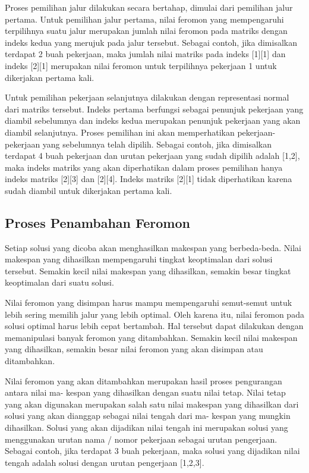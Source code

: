 	Proses pemilihan jalur dilakukan secara bertahap, dimulai dari pemilihan jalur pertama. Untuk
	pemilihan jalur pertama, nilai feromon yang mempengaruhi terpilihnya suatu jalur merupakan
	jumlah nilai feromon pada matriks dengan indeks kedua yang merujuk pada jalur tersebut. Sebagai
	contoh, jika dimisalkan terdapat 2 buah pekerjaan, maka jumlah nilai matriks pada indeks [1][1]
	dan indeks [2][1] merupakan nilai feromon untuk terpilihnya pekerjaan 1 untuk dikerjakan pertama
	kali.

	Untuk pemilihan pekerjaan selanjutnya dilakukan dengan representasi normal dari matriks tersebut.
	Indeks pertama berfungsi sebagai penunjuk pekerjaan yang diambil sebelumnya dan indeks
	kedua merupakan penunjuk pekerjaan yang akan diambil selanjutnya. Proses pemilihan ini akan
	memperhatikan pekerjaan-pekerjaan yang sebelumnya telah dipilih. Sebagai contoh, jika dimisalkan
	terdapat 4 buah pekerjaan dan urutan pekerjaan yang sudah dipilih adalah [1,2], maka indeks matriks
	yang akan diperhatikan dalam proses pemilihan hanya indeks matriks [2][3] dan [2][4]. Indeks
	matriks [2][1] tidak diperhatikan karena sudah diambil untuk dikerjakan pertama kali.


\subsection{Proses Penambahan Feromon}

	Setiap solusi yang dicoba akan menghasilkan makespan yang berbeda-beda. Nilai makespan yang
	dihasilkan mempengaruhi tingkat keoptimalan dari solusi tersebut. Semakin kecil nilai makespan
	yang dihasilkan, semakin besar tingkat keoptimalan dari suatu solusi.

	Nilai feromon yang disimpan harus mampu mempengaruhi semut-semut untuk lebih sering memilih
	jalur yang lebih optimal. Oleh karena itu, nilai feromon pada solusi optimal harus lebih cepat
	bertambah. Hal tersebut dapat dilakukan dengan memanipulasi banyak feromon yang ditambahkan.
	Semakin kecil nilai makespan yang dihasilkan, semakin besar nilai feromon yang akan disimpan
	atau ditambahkan.

	Nilai feromon yang akan ditambahkan merupakan hasil proses pengurangan antara nilai ma-
	kespan yang dihasilkan dengan suatu nilai tetap. Nilai tetap yang akan digunakan merupakan salah
	satu nilai makespan yang dihasilkan dari solusi yang akan dianggap sebagai nilai tengah dari ma-
	kespan yang mungkin dihasilkan. Solusi yang akan dijadikan nilai tengah ini merupakan solusi yang
	menggunakan urutan nama / nomor pekerjaan sebagai urutan pengerjaan. Sebagai contoh, jika
	terdapat 3 buah pekerjaan, maka solusi yang dijadikan nilai tengah adalah solusi dengan urutan
	pengerjaan [1,2,3].

